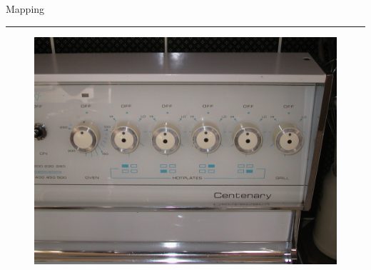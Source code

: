 \documentclass[pdf]{beamer}
\begin{document}
\newlength{\seplinewidth}
\newlength{\seplinesep}
\setlength{\seplinewidth}{1mm}
\setlength{\seplinesep}{2mm}
\newcommand*{\sepline}{%
  \par
  \cleaders\vbox{%
    \begingroup %
      \color{sepline}%
      \hrule width\linewidth height\seplinewidth
    \endgroup
  }\vskip\seplinewidth
  \vspace{-0.85cm}
}
\begin{frame}{Mapping}{\textcolor{red}{\rule{12cm}{1.2pt}}}

\begin{figure}[b]
    	\includegraphics[scale = 0.19, center]{17_Picture.jpg}
    \end{figure}

\end{frame}



\end{document}
